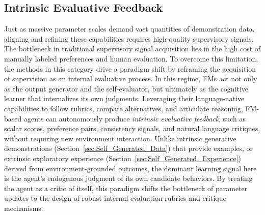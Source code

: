 \documentclass{article}
\begin{document}
\subsection{Intrinsic Evaluative Feedback}
\label{sec:Intrinsic_Evaluative_Feedback}
\label{sec:Self_Generated_Supervision}


Just as massive parameter scales demand vast quantities of demonstration data, aligning and refining these capabilities requires high-quality supervisory signals. The bottleneck in traditional supervisory signal acquisition lies in the high cost of manually labeled preferences and human evaluation. To overcome this limitation, the methods in this category drive a paradigm shift by reframing the acquisition of supervision as an internal evaluative process. In this regime, FMs act not only as the output generator and the self-evaluator, but ultimately as the cognitive learner that internalizes its own judgments. Leveraging their language-native capabilities to follow rubrics, compare alternatives, and articulate reasoning, FM-based agents can autonomously produce \textit{intrinsic evaluative feedback}, such as scalar scores, preference pairs, consistency signals, and natural language critiques, without requiring new environment interaction. Unlike intrinsic generative demonstrations (Section~\ref{sec:Self_Generated_Data}) that provide examples, or extrinsic exploratory experience (Section~\ref{sec:Self_Generated_Experience}) derived from environment-grounded outcomes, the dominant learning signal here is the agent's endogenous judgment of its own candidate behaviors. By treating the agent as a critic of itself, this paradigm shifts the bottleneck of parameter updates to the design of robust internal evaluation rubrics and critique mechanisms.
\end{document}
